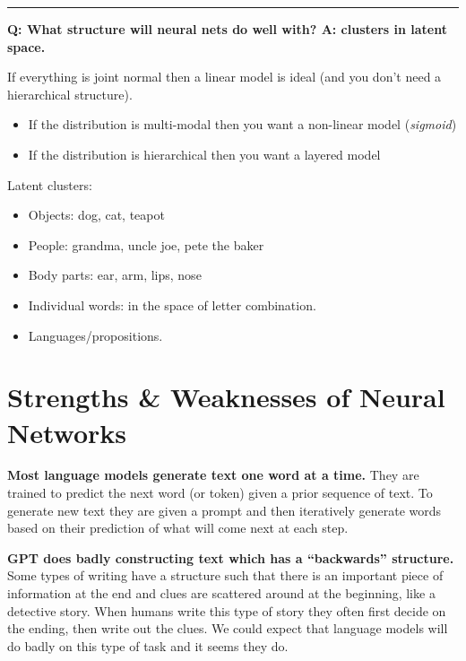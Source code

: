 \documentclass[
  11pt,
  letterpaper,
  DIV=11,
  numbers=noendperiod,
  oneside]{scrartcl}
\providecommand{\tightlist}{%
  \setlength{\itemsep}{0pt}\setlength{\parskip}{0pt}}\usepackage{longtable,booktabs,array}
\begin{document}
\begin{center}\rule{0.5\linewidth}{0.5pt}\end{center}

\textbf{Q: What structure will neural nets do well with? A: clusters in
latent space.}

If everything is joint normal then a linear model is ideal (and you
don't need a hierarchical structure).

\begin{itemize}
\tightlist
\item
  If the distribution is multi-modal then you want a non-linear model
  (\emph{sigmoid})
\item
  If the distribution is hierarchical then you want a layered model
\end{itemize}

Latent clusters:

\begin{itemize}
\tightlist
\item
  Objects: dog, cat, teapot
\item
  People: grandma, uncle joe, pete the baker
\item
  Body parts: ear, arm, lips, nose
\item
  Individual words: in the space of letter combination.
\item
  Languages/propositions.
\end{itemize}

\hypertarget{strengths-weaknesses-of-neural-networks}{%
\section{Strengths \& Weaknesses of Neural
Networks}\label{strengths-weaknesses-of-neural-networks}}

\textbf{Most language models generate text one word at a time.} They are
trained to predict the next word (or token) given a prior sequence of
text. To generate new text they are given a prompt and then iteratively
generate words based on their prediction of what will come next at each
step.

\textbf{GPT does badly constructing text which has a ``backwards''
structure.} Some types of writing have a structure such that there is an
important piece of information at the end and clues are scattered around
at the beginning, like a detective story. When humans write this type of
story they often first decide on the ending, then write out the clues.
We could expect that language models will do badly on this type of task
and it seems they do.
\end{document}
